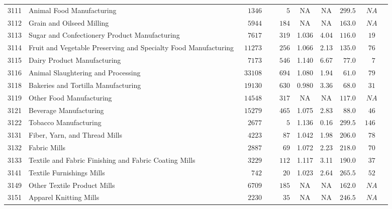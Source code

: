 \documentclass[9pt, oneside]{article}   	%
\begin{document}
\begin{longtable}{lp{3 in}ccccccc}
3111  & Animal Food Manufacturing & $\phantom{00}1346$ & $\phantom{00000}5$ &    NA &    NA & $299.5$ & $\phantom{0}NA$ \\
3112  & Grain and Oilseed Milling & $\phantom{00}5944$ & $\phantom{000}184$ &    NA &    NA & $163.0$ & $\phantom{0}NA$ \\
3113  & Sugar and Confectionery Product Manufacturing & $\phantom{00}7617$ & $\phantom{000}319$ & 1.036 &  4.04 & $116.0$ & $\phantom{0}19$ \\
3114  & Fruit and Vegetable Preserving and Specialty Food Manufacturing & $\phantom{0}11273$ & $\phantom{000}256$ & 1.066 &  2.13 & $135.0$ & $\phantom{0}76$ \\
3115  & Dairy Product Manufacturing & $\phantom{00}7173$ & $\phantom{000}546$ & 1.140 &  6.67 & $\phantom{0}77.0$ & $\phantom{00}7$ \\
3116  & Animal Slaughtering and Processing & $\phantom{0}33108$ & $\phantom{000}694$ & 1.080 &  1.94 & $\phantom{0}61.0$ & $\phantom{0}79$ \\
3118  & Bakeries and Tortilla Manufacturing & $\phantom{0}19130$ & $\phantom{000}630$ & 0.980 &  3.36 & $\phantom{0}68.0$ & $\phantom{0}31$ \\
3119  & Other Food Manufacturing & $\phantom{0}14548$ & $\phantom{000}317$ &    NA &    NA & $117.0$ & $\phantom{0}NA$ \\
3121  & Beverage Manufacturing & $\phantom{0}15279$ & $\phantom{000}465$ & 1.075 &  2.83 & $\phantom{0}88.0$ & $\phantom{0}46$ \\
3122  & Tobacco Manufacturing & $\phantom{00}2677$ & $\phantom{00000}5$ & 1.136 &  0.16 & $299.5$ & $146$ \\
3131  & Fiber, Yarn, and Thread Mills & $\phantom{00}4223$ & $\phantom{0000}87$ & 1.042 &  1.98 & $206.0$ & $\phantom{0}78$ \\
3132  & Fabric Mills & $\phantom{00}2887$ & $\phantom{0000}69$ & 1.072 &  2.23 & $218.0$ & $\phantom{0}70$ \\
3133  & Textile and Fabric Finishing and Fabric Coating Mills & $\phantom{00}3229$ & $\phantom{000}112$ & 1.117 &  3.11 & $190.0$ & $\phantom{0}37$ \\
3141  & Textile Furnishings Mills & $\phantom{000}742$ & $\phantom{0000}20$ & 1.023 &  2.64 & $265.5$ & $\phantom{0}52$ \\
3149  & Other Textile Product Mills & $\phantom{00}6709$ & $\phantom{000}185$ &    NA &    NA & $162.0$ & $\phantom{0}NA$ \\
3151  & Apparel Knitting Mills & $\phantom{00}2230$ & $\phantom{0000}35$ &    NA &    NA & $246.5$ & $\phantom{0}NA$ \\

\end{longtable}
\end{document}
